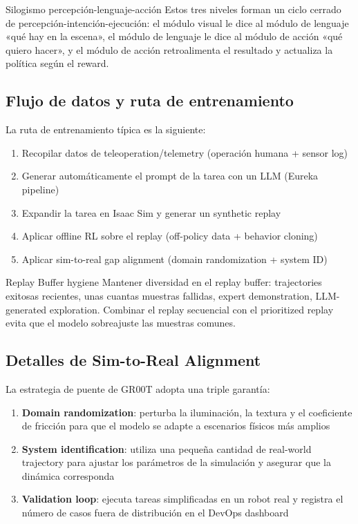 \documentclass[a4paper]{article}
\begin{document}
\begin{knowledgebox}{Silogismo percepción-lenguaje-acción}
Estos tres niveles forman un ciclo cerrado de percepción-intención-ejecución: el módulo visual le dice al módulo de lenguaje «qué hay en la escena», el módulo de lenguaje le dice al módulo de acción «qué quiero hacer», y el módulo de acción retroalimenta el resultado y actualiza la política según el reward.
\end{knowledgebox}

\subsection{Flujo de datos y ruta de entrenamiento}

La ruta de entrenamiento típica es la siguiente:

\begin{enumerate}
    \item Recopilar datos de teleoperation/telemetry (operación humana + sensor log)
    \item Generar automáticamente el prompt de la tarea con un LLM (Eureka pipeline)
    \item Expandir la tarea en Isaac Sim y generar un synthetic replay
    \item Aplicar offline RL sobre el replay (off-policy data + behavior cloning)
    \item Aplicar sim-to-real gap alignment (domain randomization + system ID)
\end{enumerate}

\begin{importantbox}{Replay Buffer hygiene}
Mantener diversidad en el replay buffer: trajectories exitosas recientes, unas cuantas muestras fallidas, expert demonstration, LLM-generated exploration. Combinar el replay secuencial con el prioritized replay evita que el modelo sobreajuste las muestras comunes.
\end{importantbox}

\subsection{Detalles de Sim-to-Real Alignment}

La estrategia de puente de GR00T adopta una triple garantía:

\begin{enumerate}
    \item \textbf{Domain randomization}: perturba la iluminación, la textura y el coeficiente de fricción para que el modelo se adapte a escenarios físicos más amplios
    \item \textbf{System identification}: utiliza una pequeña cantidad de real-world trajectory para ajustar los parámetros de la simulación y asegurar que la dinámica corresponda
    \item \textbf{Validation loop}: ejecuta tareas simplificadas en un robot real y registra el número de casos fuera de distribución en el DevOps dashboard
\end{enumerate}
\end{document}
